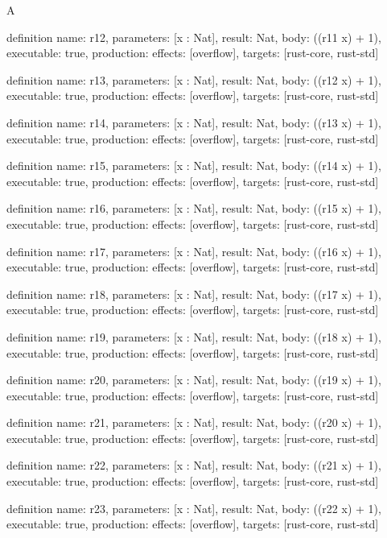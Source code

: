 \begin{lexlean}{A}
\begin{semanticmodule}
definition{
  name: r12,
  parameters: [x : Nat],
  result: Nat,
  body: ((r11 x) + 1),
  executable: true,
  production: {effects: [overflow], targets: [rust-core, rust-std]}
}

definition{
  name: r13,
  parameters: [x : Nat],
  result: Nat,
  body: ((r12 x) + 1),
  executable: true,
  production: {effects: [overflow], targets: [rust-core, rust-std]}
}

definition{
  name: r14,
  parameters: [x : Nat],
  result: Nat,
  body: ((r13 x) + 1),
  executable: true,
  production: {effects: [overflow], targets: [rust-core, rust-std]}
}

definition{
  name: r15,
  parameters: [x : Nat],
  result: Nat,
  body: ((r14 x) + 1),
  executable: true,
  production: {effects: [overflow], targets: [rust-core, rust-std]}
}

definition{
  name: r16,
  parameters: [x : Nat],
  result: Nat,
  body: ((r15 x) + 1),
  executable: true,
  production: {effects: [overflow], targets: [rust-core, rust-std]}
}

definition{
  name: r17,
  parameters: [x : Nat],
  result: Nat,
  body: ((r16 x) + 1),
  executable: true,
  production: {effects: [overflow], targets: [rust-core, rust-std]}
}

definition{
  name: r18,
  parameters: [x : Nat],
  result: Nat,
  body: ((r17 x) + 1),
  executable: true,
  production: {effects: [overflow], targets: [rust-core, rust-std]}
}

definition{
  name: r19,
  parameters: [x : Nat],
  result: Nat,
  body: ((r18 x) + 1),
  executable: true,
  production: {effects: [overflow], targets: [rust-core, rust-std]}
}

definition{
  name: r20,
  parameters: [x : Nat],
  result: Nat,
  body: ((r19 x) + 1),
  executable: true,
  production: {effects: [overflow], targets: [rust-core, rust-std]}
}

definition{
  name: r21,
  parameters: [x : Nat],
  result: Nat,
  body: ((r20 x) + 1),
  executable: true,
  production: {effects: [overflow], targets: [rust-core, rust-std]}
}

definition{
  name: r22,
  parameters: [x : Nat],
  result: Nat,
  body: ((r21 x) + 1),
  executable: true,
  production: {effects: [overflow], targets: [rust-core, rust-std]}
}

definition{
  name: r23,
  parameters: [x : Nat],
  result: Nat,
  body: ((r22 x) + 1),
  executable: true,
  production: {effects: [overflow], targets: [rust-core, rust-std]}
}


\end{semanticmodule}
\end{lexlean}
